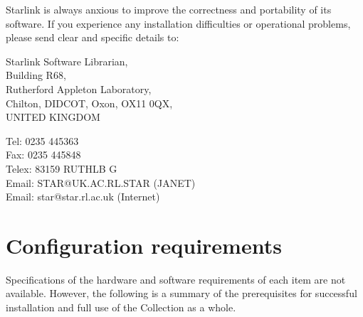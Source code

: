 \vfill

Starlink is always anxious to improve the correctness  and portability of its
software. If you experience any installation difficulties or operational
problems, please send clear and specific details to:

\vfill

\begin{center}
\parbox{80mm}
{Starlink Software Librarian,\\
Building R68,\\
Rutherford Appleton Laboratory,\\
Chilton, DIDCOT, Oxon, OX11 0QX,\\
UNITED KINGDOM}

\vspace*{5mm}

\parbox{80mm}
{Tel: 0235 445363\\
Fax: 0235 445848 \\
Telex: 83159 RUTHLB G \\
Email: STAR@UK.AC.RL.STAR \quad (JANET) \\
Email: star@star.rl.ac.uk \quad (Internet) }
\end{center}

\newpage

\section {Configuration requirements}
\label{se:config}

Specifications of the hardware and software requirements of each item are not
available. However, the following is a summary of the prerequisites for
successful installation and full use of the Collection as a whole.

